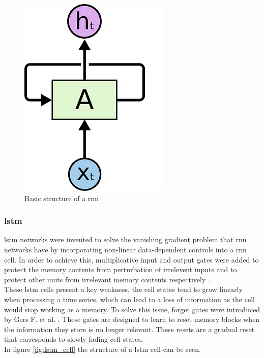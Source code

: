 \begin{figure}[h]
    \centering
    \includegraphics[scale=0.25]{images/rnn_basic.png}
    \caption{Basic structure of a \acrshort{rnn}}
    \label{fig:rnn_basic}
\end{figure}

\subsubsection{\acrfull{lstm}}
\acrshort{lstm} networks were invented to solve the vanishing gradient problem that \acrshort{rnn} networks have by incorporating non-linear data-dependent controls 
into a \acrshort{rnn} cell. In order to achieve this, multiplicative input and output gates were added to protect the memory contents from perturbation of irrelevent inputs
and to protect other units from irrelevant memory contents respectively \cite{LSTMoriginal}.
\\
These \acrshort{lstm} cells present a key weakness, the cell states tend to grow linearly when processing a time series, which can lead to a loss of information as the cell
would stop working as a memory. To solve this issue, forget gates were introduced by Gers F. et al. \cite{LSTMforget}. These gates are designed to learn to reset memory blocks
when the information they store is no longer relevant. These resets are a gradual reset that corresponds to slowly fading cell states.
\\
In figure \ref{fig:lstm_cell} the structure of a \acrshort{lstm} cell can be seen.


